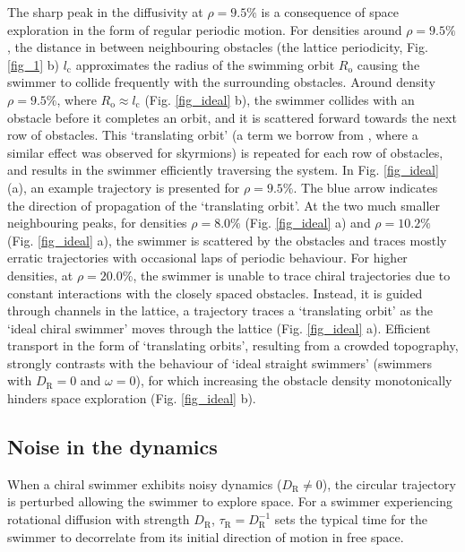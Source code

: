 \documentclass[aps,pre,twocolumn,showpacs,superscriptaddress,amsmath,amssymb,longbibliography]{revtex4-2}
\begin{document}
The sharp peak in the diffusivity at $\rho = 9.5 \%$ is a consequence of space exploration in the form of regular periodic motion. For densities around $\rho = 9.5\%$, the distance in between neighbouring obstacles (the lattice periodicity, Fig. \ref{fig_1} b) $l_{\textrm{c}}$ approximates the radius of the swimming orbit $R_{\textrm{o}}$ causing the swimmer to collide frequently with the surrounding obstacles. Around density $\rho = 9.5\%$, where $R_{\textrm{o}} \approx l_{\textrm{c}}$ (Fig. \ref{fig_ideal} b), the swimmer collides with an obstacle before it completes an orbit, and it is scattered forward towards the next row of obstacles. This `translating orbit' (a term we borrow from \citet{skyrmion}, where a similar effect was observed for skyrmions) is repeated for each row of obstacles, and results in the swimmer efficiently traversing the system. In Fig. \ref{fig_ideal} (a), an example trajectory is presented for $\rho = 9.5\%$. The blue arrow indicates the direction of propagation of the `translating orbit'. At the two much smaller neighbouring peaks, for densities $\rho = 8.0\%$ (Fig. \ref{fig_ideal} a) and $\rho = 10.2\%$ (Fig. \ref{fig_ideal} a), the swimmer is scattered by the obstacles and traces mostly erratic trajectories with occasional laps of periodic behaviour.  For higher densities, at $\rho = 20.0\%$, the swimmer is unable to trace chiral trajectories due to constant interactions with the closely spaced obstacles. Instead, it is guided through channels in the lattice, a trajectory traces a `translating orbit' as the `ideal chiral swimmer' moves through the lattice (Fig. \ref{fig_ideal} a). Efficient transport in the form of `translating orbits', resulting from a crowded topography, strongly contrasts with the behaviour of `ideal straight swimmers' (swimmers with $D_{\textrm{R}}=0$ and $\omega = 0$), for which increasing the obstacle density monotonically hinders space exploration (Fig. \ref{fig_ideal} b).

\subsection{Noise in the dynamics} 
When a chiral swimmer exhibits noisy dynamics ($D_{\textrm{R}} \neq 0$), the circular trajectory is perturbed allowing the swimmer to explore space. For a swimmer experiencing rotational diffusion with strength $D_{\textrm{R}}$, $\tau_{\textrm{R}} = D_{\textrm{R}}^{-1}$ sets the typical time for the swimmer to decorrelate from its initial direction of motion in free space.
\end{document}
